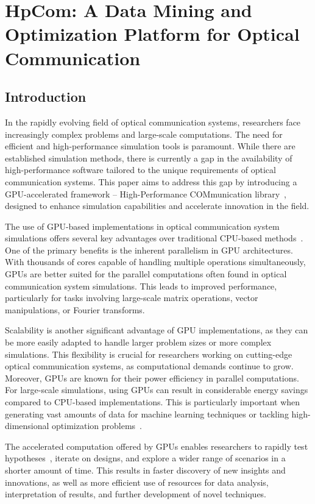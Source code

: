\chapter{HpCom: A Data Mining and Optimization Platform for Optical Communication}
\label{ch:hpcom}

\section{Introduction}
In the rapidly evolving field of optical communication systems, researchers face increasingly complex problems and large-scale computations. The need for efficient and high-performance simulation tools is paramount. While there are established simulation methods, there is currently a gap in the availability of high-performance software tailored to the unique requirements of optical communication systems. This paper aims to address this gap by introducing a GPU-accelerated framework -- High-Performance COMmunication library~\cite{esf0_2023_7880552}, designed to enhance simulation capabilities and accelerate innovation in the field.

The use of GPU-based implementations in optical communication system simulations offers several key advantages over traditional CPU-based methods~\cite{brehler2017gpu}. One of the primary benefits is the inherent parallelism in GPU architectures. With thousands of cores capable of handling multiple operations simultaneously, GPUs are better suited for the parallel computations often found in optical communication system simulations. This leads to improved performance, particularly for tasks involving large-scale matrix operations, vector manipulations, or Fourier transforms.

Scalability is another significant advantage of GPU implementations, as they can be more easily adapted to handle larger problem sizes or more complex simulations. This flexibility is crucial for researchers working on cutting-edge optical communication systems, as computational demands continue to grow.
Moreover, GPUs are known for their power efficiency in parallel computations. For large-scale simulations, using GPUs can result in considerable energy savings compared to CPU-based implementations. This is particularly important when generating vast amounts of data for machine learning techniques or tackling high-dimensional optimization problems~\cite{srivallapanondh2022knowledge, genty2021machine, reznichenko2022optimal}.

The accelerated computation offered by GPUs enables researchers to rapidly test hypotheses~\cite{winzer2012optical}, iterate on designs, and explore a wider range of scenarios in a shorter amount of time. This results in faster discovery of new insights and innovations, as well as more efficient use of resources for data analysis, interpretation of results, and further development of novel techniques.

